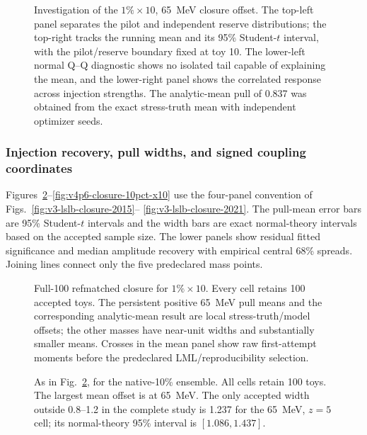 \begin{figure}[p]
\centering
{}
\caption{Investigation of the $1\%\times10$, 65~MeV closure offset.  The top-left
panel separates the pilot and independent reserve distributions; the top-right tracks
the running mean and its 95\% Student-$t$ interval, with the pilot/reserve boundary
fixed at toy 10.  The lower-left normal Q--Q diagnostic shows no isolated tail capable
of explaining the mean, and the lower-right panel shows the correlated response across
injection strengths.  The analytic-mean pull of 0.837 was obtained from the exact
stress-truth mean with independent optimizer seeds.}
\label{fig:v4p6-bias-confirmation}
\end{figure}

\subsubsection{Injection recovery, pull widths, and signed coupling coordinates}

Figures~\ref{fig:v4p6-closure-1pct-x10}--\ref{fig:v4p6-closure-10pct-x10}
use the four-panel convention of Figs.~\ref{fig:v3-lslb-closure-2015}--
\ref{fig:v3-lslb-closure-2021}.  The pull-mean error bars are 95\% Student-$t$
intervals and the width bars are exact normal-theory intervals based on the accepted
sample size.  The lower panels show residual fitted significance and median amplitude
recovery with empirical central 68\% spreads.  Joining lines connect only the five
predeclared mass points.

\begin{figure}[p]
\centering
{}
\caption{Full-100 refmatched closure for $1\%\times10$.  Every cell retains 100
accepted toys.  The persistent positive 65~MeV pull means and the corresponding
analytic-mean result are local stress-truth/model offsets; the other masses have
near-unit widths and substantially smaller means.  Crosses in the mean panel show raw
first-attempt moments before the predeclared LML/reproducibility selection.}
\label{fig:v4p6-closure-1pct-x10}
\end{figure}

\begin{figure}[p]
\centering
{}
\caption{As in Fig.~\ref{fig:v4p6-closure-1pct-x10}, for the native-10\% ensemble.
All cells retain 100 toys.  The largest mean offset is at 65~MeV.  The only accepted
width outside 0.8--1.2 in the complete study is 1.237 for the 65~MeV, $z=5$ cell; its
normal-theory 95\% interval is $[1.086,1.437]$.}
\label{fig:v4p6-closure-10pct}
\end{figure}

